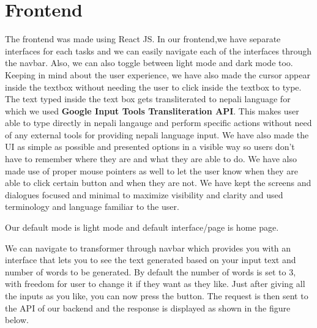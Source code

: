 \chapter{Frontend}
The frontend was made using React JS. In our frontend,we have separate interfaces for each tasks and we can easily navigate each of the interfaces through the navbar. Also, we can also toggle between light mode and dark mode too. Keeping in mind about the user experience, we have also made the cursor appear inside the textbox without needing the user to click inside the textbox to type. The text typed inside the text box gets transliterated to nepali language for which we used \textbf{Google Input Tools Transliteration API}. This makes user able to type directly in nepali langauge and perform specific actions without need of any external tools for providing nepali language input. We have also made the UI as simple as possible and presented options in a visible way so users don’t have to remember where they are and what they are able to do. We have also made use of proper mouse pointers as well to let the user know when they are able to click certain button and when they are not. We have kept the screens and dialogues focused and minimal to maximize visibility and clarity and used terminology and language familiar to the user. 

Our default mode is light mode and default interface/page is home page. 




We can navigate to transformer through navbar which provides you with an interface that lets you to see the text generated based on your input text and number of words to be generated. By default the number of words is set to 3, with freedom for user to change it if they want as they like. Just after giving all the inputs as you like, you can now press the button. The request is then sent to the API of our backend and the response is displayed as shown in the figure below.

